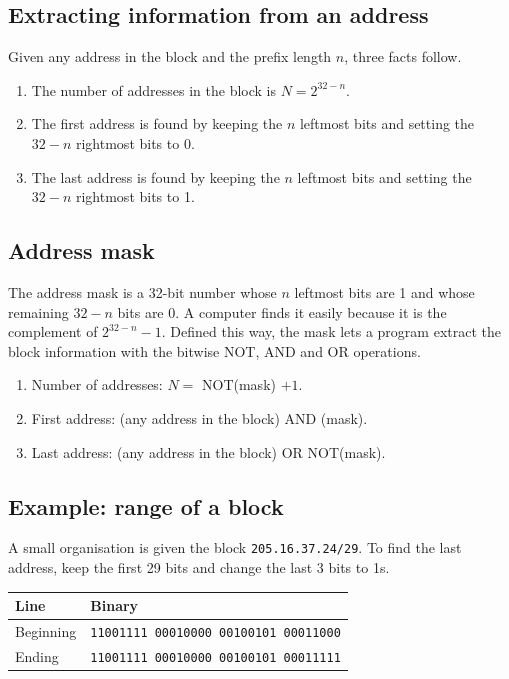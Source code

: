 \documentclass[11pt,a4paper]{article}
\begin{document}
\subsection{Extracting information from an address}

Given any address in the block and the prefix length $n$, three facts follow.

\begin{enumerate}\itemsep3pt
  \item The number of addresses in the block is $N = 2^{32-n}$.
  \item The first address is found by keeping the $n$ leftmost bits and setting the $32 - n$
        rightmost bits to 0.
  \item The last address is found by keeping the $n$ leftmost bits and setting the $32 - n$
        rightmost bits to 1.
\end{enumerate}

\subsection{Address mask}

The address mask is a 32-bit number whose $n$ leftmost bits are 1 and whose remaining
$32 - n$ bits are 0. A computer finds it easily because it is the complement of $2^{32-n} - 1$.
Defined this way, the mask lets a program extract the block information with the bitwise NOT,
AND and OR operations.

\begin{enumerate}\itemsep2pt
  \item Number of addresses: $N = $ NOT(mask) $+ 1$.
  \item First address: (any address in the block) AND (mask).
  \item Last address: (any address in the block) OR NOT(mask).
\end{enumerate}

\newpage
\subsection*{Example: range of a block}

A small organisation is given the block \texttt{205.16.37.24/29}. To find the last address,
keep the first 29 bits and change the last 3 bits to 1s.

\begin{tabularx}{\textwidth}{@{}lX@{}}
\toprule
\rowcolor{tablehead}\textbf{Line} & \textbf{Binary} \\
\midrule
Beginning & \texttt{11001111 00010000 00100101 00011000} \\
Ending & \texttt{11001111 00010000 00100101 00011111} \\
\bottomrule
\end{tabularx}
\end{document}
